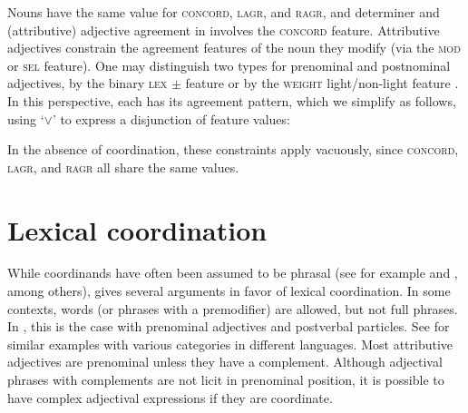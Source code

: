 \ea
{}
\z
\ea
{}  
\z

\largerpage
Nouns have the same value for  \textsc{concord}, \textsc{lagr}, and \textsc{ragr}, and 
determiner and (attributive) adjective agreement in   involves the  \textsc{concord} feature.
Attributive adjectives constrain the agreement features of the noun they modify (via the \textsc{mod} or \textsc{sel} feature). One may distinguish two types for prenominal and postnominal adjectives, by the binary \textsc{lex} $\pm$ feature \citep{Sadler:Arnold:94} or by the \textsc{weight} light/non-light feature \citep{Abeille:Godard:99}. In this perspective, each has its agreement pattern, which we simplify as follows, using `$\vee$' to express a disjunction of feature values:

\ea
{}
\z
\ea
{}
\z

\noindent
In the absence of coordination, these constraints apply vacuously, since \textsc{concord}, \textsc{lagr}, and \textsc{ragr} all share the same values. 


\section{Lexical coordination}\label{lexcoord}\label{coordination:sec-lexical-coordination}


While coordinands have often been assumed to be phrasal (see for example \citealt[Section~6.2]{Kayne:94} and \citealt[Section~5.2]{bruening}, among others), \citet{Abeille:06} gives several arguments in favor of lexical coordination.
In some contexts, words (or phrases with a premodifier) are allowed, but not full phrases. In , this is the case with prenominal adjectives and postverbal particles. See \citet[Section~4]{Abeille:06} for similar examples with various categories in different languages. Most  attributive adjectives are prenominal unless they have a complement. Although  adjectival phrases with complements are not licit in prenominal position,  it is possible to have complex adjectival expressions if they are coordinate.

